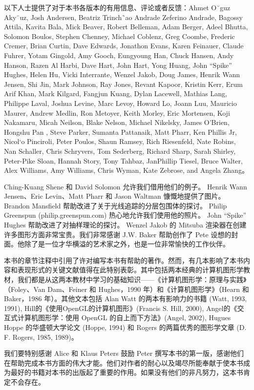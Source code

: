 \documentclass[lang=cn,12pt,marginpar=margintrue]{elegantbook}
\begin{document}
以下人士提供了对于本书各版本的有用信息、评论或者反馈：Ahmet O˘guz Aky¨uz, Josh Andersen, Beatriz Trinch˜ao Andrade Zeferino Andrade, Bagossy Attila, Kavita Bala, Mick Beaver, Robert Belleman, Adam Berger, Adeel Bhutta, Solomon Boulos, Stephen Chenney, Michael Coblenz, Greg Coombe, Frederic Cremer, Brian Curtin, Dave Edwards, Jonathon Evans, Karen Feinauer, Claude Fuhrer, Yotam Gingold, Amy Gooch, Eungyoung Han, Chuck Hansen, Andy Hanson, Razen Al Harbi, Dave Hart, John Hart, Yong Huang, John “Spike” Hughes, Helen Hu, Vicki Interrante, Wenzel Jakob, Doug James, Henrik Wann Jensen, Shi Jin, Mark Johnson, Ray Jones, Revant Kapoor, Kristin Kerr, Erum Arif Khan, Mark Kilgard, Fangjun Kuang, Dylan Lacewell, Mathias Lang, Philippe Laval, Joshua Levine, Marc Levoy, Howard Lo, Joann Luu, Mauricio Maurer, Andrew Medlin, Ron Metoyer, Keith Morley, Eric Mortensen, Koji Nakamaru, Micah Neilson, Blake Nelson, Michael Nikelsky, James O’Brien, Hongshu Pan , Steve Parker, Sumanta Pattanaik, Matt Pharr, Ken Phillis Jr, Nicol`o Pinciroli, Peter Poulos, Shaun Ramsey, Rich Riesenfeld, Nate Robins, Nan Schaller, Chris Schryvers, Tom Sederberg, Richard Sharp, Sarah Shirley, Peter-Pike Sloan, Hannah Story, Tony Tahbaz, JanPhillip Tiesel, Bruce Walter, Alex Williams, Amy Williams, Chris Wyman, Kate Zebrose, and Angela Zhang。

Ching-Kuang Shene 和 David Solomon 允许我们借用他们的例子。 Henrik Wann Jensen、Eric Levin、Matt Pharr 和 Jason Waltman 慷慨地提供了图片。 Brandon Mansfield 帮助改进了关于光线追踪的分层包围体的探讨。 Philip Greenspun (philip.greenspun.com) 热心地允许我们使用他的照片。 John “Spike” Hughes 帮助改进了对抽样理论的探讨。 Wenzel Jakob 的 Mitsuba 渲染器在创建许多图形方面非常宝贵。我们非常感谢 J.W. Baker 帮助创作了 Pete 设想的封面。他除了是一位才华横溢的艺术家之外，也是一位非常愉快的工作伙伴。

本书的章节注释中引用了许对编写本书有帮助的著作。然而，有几本影响了本书内容和表现形式的关键文献值得在此特别表彰。其中包括两本经典的计算机图形学教材，我们都是从这两本教材中学习的基础知识——《计算机图形学：原理与实践》（Foley、Van Dam、Feiner 和 Hughes，1990 年）和《计算机图形学》（Hearn 和 Baker，1986 年）。其他文本包括 Alan Watt 的两本有影响力的书籍 (Watt, 1993, 1991), Hill的《使用OpenGL的计算机图形》(Francis S. Hill, 2000), Angel的《交互式计算机图形学：使用 OpenGL 的自上而下方法》(Angel, 2002), Hugues Hoppe 的华盛顿大学论文 (Hoppe, 1994) 和 Rogers 的两篇优秀的图形学文章 (D. F. Rogers, 1985, 1989)。

我们要特别感谢 Alice 和 Klaus Peters 鼓励 Peter 撰写本书的第一版，感谢他们在帮助完成本书方面的伟大才能。他们对作者的耐心以及竭尽所能奉献于使本书成为最好的书籍对本书的出版起了重要的作用。如果没有他们的非凡努力，这本书肯定不会存在。
\end{document}
